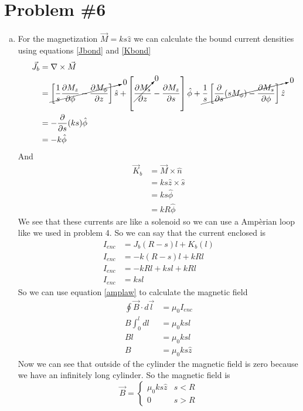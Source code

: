 \documentclass[11pt]{article}
\numberwithin{equation}{section}
\newcommand{\grad}{\bold\nabla}
\begin{document}
\section{Problem \#6}
\begin{enumerate}[(a)]
\item
For the magnetization $\vec{M} = ks\hat{z}$ we can calculate the bound current densities using equations \ref{Jbond} and \ref{Kbond}
\begin{align*}
\vec{J}_b &= \grad\times\vec{M}\\
&= \cancelto{0}{\left[\frac{1}{s}\frac{\partial M_z}{\partial\phi} - \frac{\partial M_{\phi}}{\partial z}\right]\hat{s}} + \left[\cancelto{0}{\frac{\partial M_s}{\partial z}} - \frac{\partial M_{z}}{\partial s}\right]\hat{\phi} + \cancelto{0}{\frac{1}{s}\left[\frac{\partial}{\partial s}(sM_{\phi}) - \frac{\partial M_s}{\partial\phi}\right]\hat{z}}\\
&= -\frac{\partial }{\partial s}(ks)\hat{\phi}\\  
&= -k\hat{\phi}  
\end{align*}
And
\begin{align*}
\vec{K}_b &= \vec{M}\times\hat{n}\\
&= ks\hat{z}\times\hat{s}\\
&= ks\hat{\phi}\\
&= kR\hat{\phi}
\end{align*}
We see that these currents are like a solenoid so we can use a Amp\`{e}rian loop like we used in problem 4. So we can say that the current enclosed is
\begin{align*}
I_{enc} &= J_b(R-s)l+K_b(l)\\
I_{enc} &= -k(R-s)l+kRl\\
I_{enc} &= -kRl+ksl+kRl\\
I_{enc} &= ksl
\end{align*}
So we can use equation \ref{amplaw} to calculate the magnetic field
\begin{align*}
\oint\vec{B}\cdot d\vec{l} &= \mu_0I_{enc}\\
B\int_0^l dl &= \mu_0ksl\\
Bl &= \mu_0ksl\\
B &= \mu_0ks\hat{z}
\end{align*}
Now we can see that outside of the cylinder the magnetic field is zero because we have an infinitely long cylinder. So the magnetic field is
$$\vec{B} = \left\{\begin{array}{lc}
	\mu_0ks\hat{z}		&s<R\\
	0			&s>R
		\end{array}\right.$$


\end{enumerate}
\end{document}
